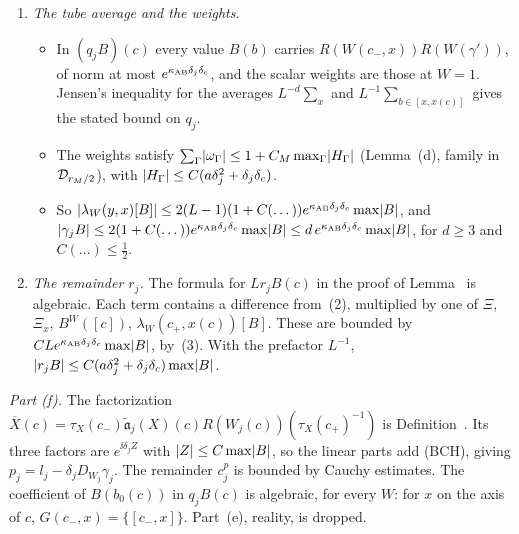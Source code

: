 \begin{detail}
\begin{enumerate}[label=(\arabic*)]
\begin{itemize}
  \item $W_j(c)=e^{\ii \Eloop}W([c])$ gives $R(h_xW([c]))-R(W_j(c))=\big(R(h_xe^{-\ii \Eloop})-1\big)R(W_j(c))$, of norm at most $2C(\xaabs{\Eloop}+\xaabs{H_x})$.
  \end{itemize}
\item \emph{The tube average and the weights.}
  \begin{itemize}
  \item In $(q_jB)(c)$ every value $B(b)$ carries $R(W(c_-,x))R(W(\gamma'))$, of norm at most $e^{\kappa_{\rm AB}\delta_j\delta_c}$, and the scalar weights are those at $W=1$. Jensen's inequality for the averages $L^{-d}\sum_x$ and $L^{-1}\sum_{b\in[x,x(c)]}$ gives the stated bound on $q_j$.
  \item The weights satisfy $\sum_\Gamma\lvert\omega_\Gamma\rvert\le1+C_M\max_\Gamma\lvert H_\Gamma\rvert$ (Lemma~(d), family in $\mathcal D_{r_M/2}$), with $\lvert H_\Gamma\rvert\le C(a\delta_j^2+\delta_j\delta_c)$.
  \item So $\lvert\lambda_W(y,x)[B]\rvert\le2(L-1)(1+C(\dots))e^{\kappa_{\rm AB}\delta_j\delta_c}\max\lvert B\rvert$, and $\lvert\gamma_jB\rvert\le2(1+C(\dots))e^{\kappa_{\rm AB}\delta_j\delta_c}\max\lvert B\rvert\le d\,e^{\kappa_{\rm AB}\delta_j\delta_c}\max\lvert B\rvert$, for $d\ge3$ and $C(\dots)\le\frac12$.
  \end{itemize}
\item \emph{The remainder $r_j$.} The formula for $Lr_jB(c)$ in the proof of Lemma~ is algebraic. Each term contains a difference from~(2), multiplied by one of $\Xi$, $\Xi_x$, $B^W([c])$, $\lambda_W(c_+,x(c))[B]$. These are bounded by $CLe^{\kappa_{\rm AB}\delta_j\delta_c}\max\lvert B\rvert$, by~(3). With the prefactor $L^{-1}$, $\lvert r_jB\rvert\le C(a\delta_j^2+\delta_j\delta_c)\max\lvert B\rvert$.
\end{enumerate}
\emph{Part (f).} The factorization $\overline X(c)=\tau_X(c_-)\tilde{\mathfrak a}_j(X)(c)R(W_j(c))(\tau_X(c_+)^{-1})$ is Definition~. Its three factors are $e^{\ii\delta_jZ}$ with $\lvert Z\rvert\le C\max\lvert B\rvert$, so the linear parts add (BCH), giving $p_j=l_j-\delta_jD_{W_j}\gamma_j$. The remainder $c^p_j$ is bounded by Cauchy estimates. The coefficient of $B(b_0(c))$ in $q_jB(c)$ is algebraic, for every $W$: for $x$ on the axis of $c$, $G(c_-,x)=\{[c_-,x]\}$. Part~(e), reality, is dropped.
\end{detail}

